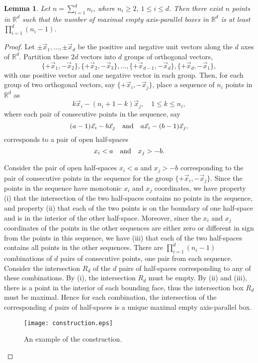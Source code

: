 \documentclass[11pt]{article}
\newtheorem{lemma}{Lemma}
\newcommand{\old}[1]{{}}
\newcommand{\RR}{\mathbb{R}}
\begin{document}
\begin{lemma}\label{lem:construction}
Let $n = \sum_{i=1}^d n_i$, where $n_i \ge 2$, $1 \le i \le d$.
Then there exist $n$ points in $\RR^d$
such that the number of maximal empty axis-parallel boxes in $\RR^d$
is at least $\prod_{i=1}^d (n_i - 1)$.
\end{lemma}
\begin{proof}
Let $\pm\vec x_1, \ldots, \pm\vec x_d$
be the positive and negative unit vectors along the $d$ axes of $\RR^d$.
Partition these $2d$ vectors into $d$ groups of orthogonal vectors,
$$
\{+\vec x_1, -\vec x_2\}, \{+\vec x_2, -\vec x_3\},
	\ldots, \{+\vec x_{d-1}, -\vec x_d\}, \{+\vec x_d, -\vec x_1\},
$$
with one positive vector and one negative vector in each group.
Then, for each group of two orthogonal vectors, say $\{+\vec x_i, -\vec x_j\}$,
place a sequence of $n_i$ points in $\RR^d$ as
$$
k \vec x_i - (n_i + 1 - k) \vec x_j, \quad 1 \le k \le n_i,
$$
where each pair of consecutive points in the sequence,
say
$$(a - 1) \vec x_i - b \vec x_j
\quad\textup{and}\quad
a \vec x_i - (b - 1) \vec x_j,
$$
corresponds to a pair of open half-spaces
$$
x_i < a
\quad\textup{and}\quad
x_j > -b.
$$
\old{
The intersection of the two half-spaces
contains all points in the other sequences but no points in this sequence,
and is bounded by the two points
in the two directions $+\vec x_i$ and $-\vec x_j$.
There are $\prod_{i=1}^d (n_i - 1)$ combinations of
$d$ pairs of consecutive points,
one pair from each sequence.
For each combination,
the intersection of the corresponding $d$ pairs of half-spaces
is a unique maximal empty axis-parallel box.
}

Consider the pair of open half-spaces $x_i < a$ and $x_j > -b$
corresponding to the pair of consecutive points in the sequence for
the group $\{ +\vec x_i, -\vec x_j \}$.
Since the points in the sequence have monotonic $x_i$ and $x_j$ coordinates,
we have property (i) that
the intersection of the two half-spaces contains no points in the sequence,
and property (ii) that
each of the two points is on the boundary of one half-space
and is in the interior of the other half-space.
Moreover,
since the $x_i$ and $x_j$ coordinates of the points in the other sequences
are either zero or different in sign from the points in this sequence,
we have (iii) that
each of the two half-spaces contains all points in the other sequences.
There are $\prod_{i=1}^d (n_i - 1)$ combinations of $d$ pairs of consecutive
points, one pair from each sequence.
Consider the intersection $R_d$ of the $d$ pairs of half-spaces
corresponding to any of these combinations.
By (i), the intersection $R_d$ must be empty.
By (ii) and (iii),
there is a point in the interior of each bounding face,
thus the intersection box $R_d$ must be maximal.
Hence for each combination,
the intersection of the corresponding $d$ pairs of half-spaces
is a unique maximal empty axis-parallel box.
\begin{figure}[htb]
\centering\texttt{[image: construction.eps]}
\caption{An example of the construction.}
\label{fig:construction}
\end{figure}


\end{proof}
\end{document}

